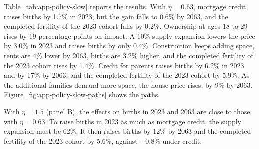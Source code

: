Table~\ref{tab:app-policy-slow} reports the results. With $\eta=0.63$,
mortgage credit raises births by 1.7\% in 2023, but the gain falls to 0.6\%
by 2063, and the completed fertility of the 2023 cohort falls by 0.2\%.
Ownership at ages 18 to 29 rises by 19 percentage points on impact. A 10\%
supply expansion lowers the price by 3.0\% in 2023 and raises births by only
0.4\%. Construction keeps adding space, rents are 4\% lower by 2063, births
are 3.2\% higher, and the completed fertility of the 2023 cohort rises by
1.4\%. Credit for parents raises births by 6.2\% in 2023 and by 17\% by 2063,
and the completed fertility of the 2023 cohort by 5.9\%. As the additional
families demand more space, the house price rises, by 9\% by 2063.
Figure~\ref{fig:app-policy-slow-paths} shows the paths.

With $\eta=1.5$ (panel B), the effects on births in 2023 and 2063 are close
to those with $\eta=0.63$. To raise births in 2023 as much as mortgage credit,
the supply expansion must be 62\%. It then raises births by 12\% by 2063 and
the completed fertility of the 2023 cohort by 5.6\%, against $-0.8\%$ under
credit.


